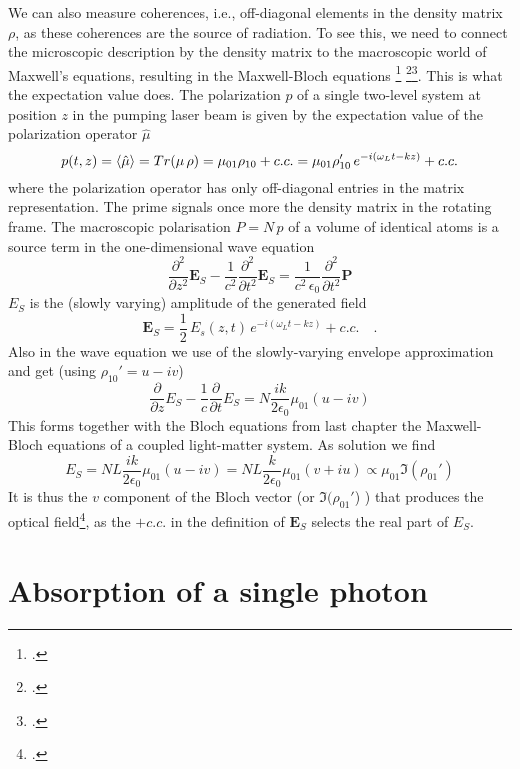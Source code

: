 We can also measure coherences, i.e., off-diagonal elements in the density matrix $\rho$, as these coherences are the source of radiation. To see this, we need to connect the microscopic description by the density matrix to the macroscopic world of Maxwell's equations, resulting in the Maxwell-Bloch equations \footcite[chapter 8.3]{MilonniEberly1988} \footcite[chapter 3.9]{Rand2016}\footcite{Meschede-OLL}. This is what the expectation value does. The  polarization $p$ of a single two-level system at position $z$ in the pumping laser beam is given by the expectation value of the polarization operator $\hat{\mu}$
\[
 p(t,z) = \braket{\hat{\mu}} = Tr ( \mu \, \rho) = \mu_{01} \rho_{10} + c.c. =   \mu_{01}  \rho_{10}' \, e^{-i (\omega_L t - k z)}  + c.c.
\]
where the polarization operator has only off-diagonal entries in the matrix representation. The prime signals once more the density matrix in the rotating frame. The macroscopic polarisation $P = N \, p$ of a volume of identical atoms is a source term in the one-dimensional wave equation
\[
  \frac{\partial^2}{\partial z^2} \boldsymbol{E}_S  - \frac{1}{c^2} \frac{\partial^2}{\partial t^2} \boldsymbol{E}_S 
 =  
\frac{1}{c^2\, \epsilon_0} \frac{\partial^2}{\partial t^2} \boldsymbol{P}  
\]
$E_S$ is the (slowly varying) amplitude of the generated field
\[
 \boldsymbol{E}_S = \frac{1}{2} \, E_s(z,t) \, e^{-i (\omega_L t - k z)}  + c.c. \quad .
\]
Also in the wave equation we  use of the slowly-varying envelope approximation and get (using $\rho_{10}' = u - i v$)
\[
  \frac{\partial}{\partial z} E_S  - \frac{1}{c} \frac{\partial}{\partial t} E_S
 =  
N \frac{i k }{2 \epsilon_0}  \mu_{01} ( u - i v)
\]
This forms together with the Bloch equations from last chapter the Maxwell-Bloch equations of a coupled light-matter system. As solution we find
\[
 E_S = N L \frac{i k }{2 \epsilon_0}  \mu_{01} ( u - i v)
 =
  N L \frac{k }{2 \epsilon_0}  \mu_{01} (v + i u)
  \propto \mu_{01} \Im (\rho_{01}' ) 
\]
It is thus the $v$ component of the Bloch vector (or $\Im (\rho_{01}'$) ) that produces the optical field\footcite[chapter V.B.1]{CT-atom-photon}, as the $ + c.c.$  in the definition of $ \boldsymbol{E}_S $ selects the real part of $ E_S$.
%


\section{Absorption of a single photon}


